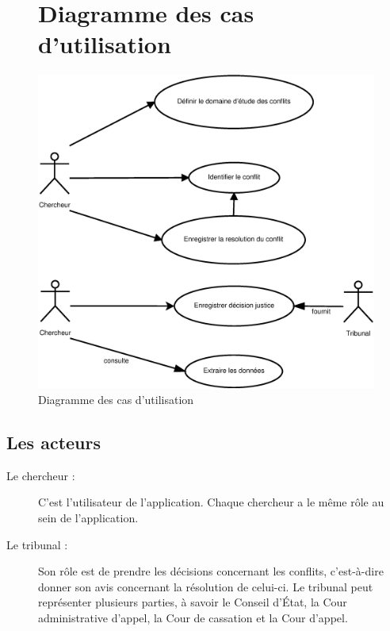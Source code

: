 \documentclass[12pt,a4paper]{article}
\begin{document}
\clearpage
\begin{figure}
\section{Diagramme des cas d'utilisation}
\vspace{0.5cm}
\centering
\includegraphics[width=\textwidth]{Image/CU.eps}
\caption{Diagramme des cas d'utilisation}
\end{figure}

\vspace{1cm}
\subsection{Les acteurs}
\begin{description}
\item[Le chercheur :]C'est l'utilisateur de l'application. Chaque chercheur a le même rôle au sein de l'application. 
\item[Le tribunal :] Son rôle est de prendre les décisions concernant les conflits, c'est-à-dire donner son avis concernant la résolution de celui-ci. \newline
Le tribunal peut représenter plusieurs parties, à savoir le Conseil d'État, la Cour administrative d'appel, la Cour de cassation et la Cour d'appel.
\end{description}
\end{document}
